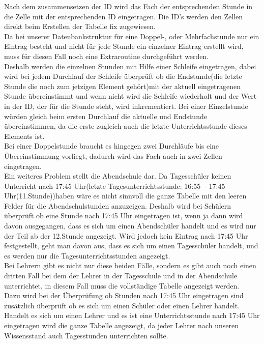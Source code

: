 Nach dem zusammensetzen der ID wird das Fach der entsprechenden Stunde in die Zelle mit der entsprechenden ID eingetragen. Die ID's werden den Zellen direkt beim Erstellen der Tabelle fix zugewiesen.\\
Da bei unserer Datenbankstruktur für eine Doppel-, oder Mehrfachstunde nur ein Eintrag besteht und nicht für jede Stunde ein einzelner Eintrag erstellt wird, muss für diesen Fall noch eine Extraroutine durchgeführt werden.\\
Deshalb werden die einzelnen Stunden mit Hilfe einer Schleife eingetragen, dabei wird bei jedem Durchlauf der Schleife überprüft ob die Endstunde(die letzte Stunde die noch zum jetzigen Element gehört)mit der aktuell eingetragenen Stunde übereinstimmt und wenn nicht wird die Schleife wiederholt und der Wert in der ID, der für die Stunde steht, wird inkrementiert. Bei einer Einzelstunde würden gleich beim ersten Durchlauf die aktuelle und Endstunde übereinstimmen, da die erste zugleich auch die letzte Unterrichtsstunde dieses Elements ist.\\
Bei einer Doppelstunde braucht es hingegen zwei Durchläufe bis eine Übereinstimmung vorliegt, dadurch wird das Fach auch in zwei Zellen eingetragen.\\
Ein weiteres Problem stellt die Abendschule dar. Da Tagesschüler keinen Unterricht nach 17:45 Uhr(letzte Tagesunterrichtsstunde: 16:55 – 17:45 Uhr(11.Stunde))haben wäre es nicht sinnvoll die ganze Tabelle mit den leeren Felder für die Abendschulstunden anzuzeigen. Deshalb wird bei Schülern überprüft ob eine Stunde nach 17:45 Uhr eingetragen ist, wenn ja dann wird davon ausgegangen, dass es sich um einen Abendschüler handelt und es wird nur der Teil ab der 12.Stunde angezeigt. Wird jedoch kein Eintrag nach 17:45 Uhr festgestellt, geht man davon aus, dass es sich um einen Tagesschüler handelt, und es werden nur die Tagesunterrichtsstunden angezeigt.\\
Bei Lehrern gibt es nicht nur diese beiden Fälle, sondern es gibt auch noch einen dritten Fall bei dem der Lehrer in der Tagesschule und in der Abendschule unterrichtet, in diesem Fall muss die vollständige Tabelle angezeigt werden.\\
Dazu wird bei der Überprüfung ob Stunden nach 17:45 Uhr eingetragen sind zusätzlich überprüft ob es sich um einen Schüler oder einen Lehrer handelt. Handelt es sich um einen Lehrer und es ist eine Unterrichtsstunde nach 17:45 Uhr eingetragen wird die ganze Tabelle angezeigt, da jeder Lehrer nach unseren Wissensstand auch Tagesstunden unterrichten sollte.\\

